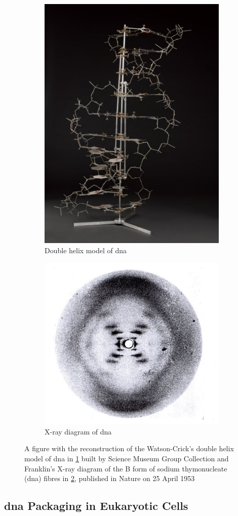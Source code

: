 \begin{figure}[H]
\centering
\begin{subfigure}{.5\textwidth}
    \centering
    \includegraphics[width=.4\linewidth]{figs/watson_crick.jpg}
    \caption{Double helix model of \ac{dna}}
    \label{fig:watcrick}
\end{subfigure}%
\begin{subfigure}{.5\textwidth}
    \centering
    \includegraphics[width=.6\linewidth]{figs/franklin.jpg}
    \caption{X-ray diagram of \ac{dna}}
    \label{fig:franklin}
\end{subfigure}
\caption{A figure with the reconstruction of the Watson-Crick's double helix model of \ac{dna} in \ref{fig:watcrick} built by Science Museum Group Collection \cite{watcrick} and Franklin's X-ray diagram of the B form of sodium thymonucleate (\ac{dna}) fibres in \ref{fig:franklin}, published in Nature on 25 April 1953 \cite{Maddox2003}}
\label{fig:test}
\end{figure}


\subsection{\acs{dna} Packaging in Eukaryotic Cells} \label{subsec:genetics_packaging}

